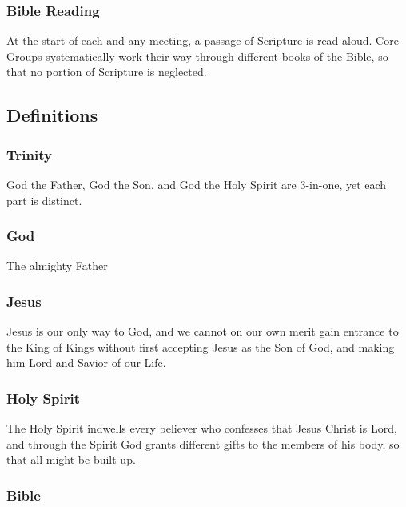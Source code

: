 \documentclass[CSHFoundation.tex]{subfiles}
\begin{document}
\subsubsection{Bible Reading}

At the start of each and any meeting, a passage of Scripture is read aloud. Core Groups systematically work their way through different books of the Bible, so that no portion of Scripture is neglected.



\subsection{Definitions}



\subsubsection{Trinity}

God the Father, God the Son, and God the Holy Spirit are 3-in-one, yet each part is distinct.



\subsubsection{God}

The almighty Father



\subsubsection{Jesus}

Jesus is our only way to God, and we cannot on our own merit gain entrance to the King of Kings without first accepting Jesus as the Son of God, and making him Lord and Savior of our Life.



\subsubsection{Holy Spirit}

The Holy Spirit indwells every believer who confesses that Jesus Christ is Lord, and through the Spirit God grants different gifts to the members of his body, so that all might be built up.



\subsubsection{Bible}
\end{document}
